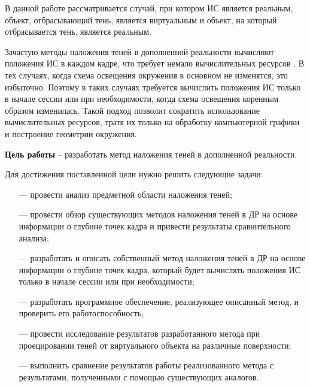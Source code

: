В данной работе рассматривается случай, при котором ИС является реальным, объект, отбрасывающий тень, является виртуальным и объект, на который отбрасывается тень, является реальным.

Зачастую методы наложения теней в дополненной реальности вычисляют положения ИС в каждом кадре, что требует немало вычислительных ресурсов \cite{osti2019real}. В тех случаях, когда схема освещения окружения в основном не изменятся, это избыточно. Поэтому в таких случаях требуется вычислить положения ИС только в начале сессии или при необходимости, когда схема освещения коренным образом изменилась. Такой подход позволит сократить использование вычислительных ресурсов, тратя их только на обработку компьютерной графики и построение геометрии окружения.

\textbf{Цель работы} -- разработать метод наложения теней в дополненной реальности.

Для достижения поставленной цели нужно решить следующие задачи:

\begin{itemize}
	\item[---] провести анализ предметной области наложения теней;
	\item[---] провести обзор существующих методов наложения теней в ДР на основе информации о глубине точек кадра и привести результаты сравнительного анализа;
	\item[---] разработать и описать собственный метод наложения теней в ДР на основе информации о глубине точек кадра, который будет вычислять положения ИС только в начале сессии или при необходимости;
	\item[---] разработать программное обеспечение, реализующее описанный метод, и проверить его работоспособность;
	\item[---] провести исследование результатов разработанного метода при проецировании теней от виртуального объекта на различные поверхности;
	\item[---] выполнить сравнение результатов работы реализованного метода с результатами, полученными с помощью существующих аналогов.
\end{itemize}